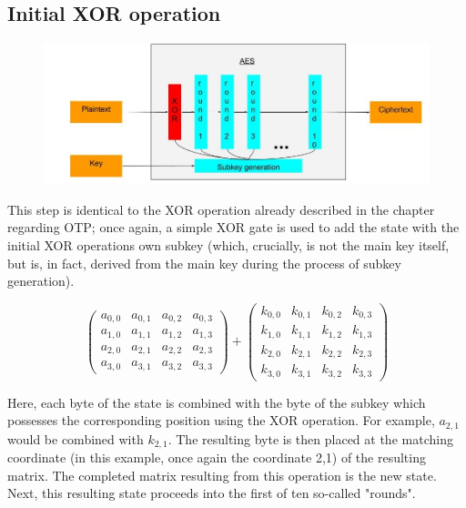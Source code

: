 \documentclass[12pt]{report}
\begin{document}
\subsection{Initial XOR operation}

\begin{figure}[H]
\centering
\includegraphics[scale=0.4]{AES_fig2.jpg}
\end{figure}

This step is identical to the XOR operation already described in the chapter regarding OTP; once again, a simple XOR gate is used to add the state with the initial XOR operations own subkey (which, crucially, is not the main key itself, but is, in fact, derived from the main key during the process of subkey generation).

\[ 
\left( \begin{array}{cccc}
a_{0,0} & a_{0,1} & a_{0,2} & a_{0,3} \\
a_{1,0} & a_{1,1} & a_{1,2} & a_{1,3} \\
a_{2,0} & a_{2,1} & a_{2,2} & a_{2,3} \\
a_{3,0} & a_{3,1} & a_{3,2} & a_{3,3}\end{array} \right)
+
\left( \begin{array}{cccc}
k_{0,0} & k_{0,1} & k_{0,2} & k_{0,3} \\
k_{1,0} & k_{1,1} & k_{1,2} & k_{1,3} \\
k_{2,0} & k_{2,1} & k_{2,2} & k_{2,3} \\
k_{3,0} & k_{3,1} & k_{3,2} & k_{3,3}\end{array} \right)
\]

Here, each byte of the state is combined with the byte of the subkey which possesses the corresponding position using the XOR operation. For example, $a_{2,1}$ would be combined with $k_{2,1}$. The resulting byte is then placed at the matching coordinate (in this example, once again the coordinate 2,1) of the resulting matrix. The completed matrix resulting from this operation is the new state. Next, this resulting state proceeds into the first of ten so-called "rounds".
\end{document}
